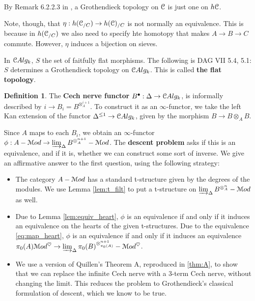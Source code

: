 \documentclass[10pt,a4paper,reqno,oneside]{book} %
\theoremstyle{plain}
\theoremstyle{definition}
\newtheorem{defin}[thm]{Definition}
\theoremstyle{remark}
\numberwithin{equation}{section}
\begin{document}
By Remark 6.2.2.3 in \cite{HTT}, a Grothendieck topology on $\mathcal C$ is just one on $h\mathcal C$.

Note, though, that $\eta : h(\mathcal C_{/C}) \to h(\mathcal C)_{/C}$ is not normally an equivalence. This is because in $h(\mathcal C_{/C})$
we also need to specify hte homotopy that makes $A \to B \to C$ commute. However, $\eta$ induces a bijection on sieves.

In $\mathcal C Alg_k$, $S$ the set of faitfully flat morphisms. The following is DAG VII 5.4, 5.1: $S$
determines a Grothendieck topology on $\mathcal C Alg_k$. This is called \textbf{the flat topology}.

\begin{defin}
The \textbf{Cech nerve functor} $B^{\bullet} : \Delta \to \mathcal C Alg_k$, is informally described by $i \to B_i = B^{\otimes_A^{i+1}}$.
To construct it as an $\infty$-functor, we take the left Kan extension of the functor $\Delta^{\leq 1} \to \mathcal C Alg_k$, given
by the morphism $B \to B \otimes_A B$. 
\end{defin}


Since $A$ maps to each $B_i$, we obtain an $\infty$-functor $\phi: A-\mathcal M od \to \varinjlim_{\Delta} B^{\otimes_A^{n+1}} - \mathcal M od$.
The \textbf{descent problem} asks if this is an equivalence, and if it is,
whether we can construct some sort of inverse. We give an affirmative answer to the first question, using the following
strategy:
\begin{itemize}
\item The category $A-\mathcal M od$ has a standard t-structure given by the degrees of the modules. We use Lemma \ref{lem:t_filt}
to put a t-structure on $\varinjlim_{\Delta} B^{\otimes_A^{n}} - \mathcal M od$ as well.
\item Due to Lemma \ref{lem:equiv_heart}, $\phi$ is an equivalence if and only if it induces an equivalence on the hearts
of the given t-structures. Due to the equivalence \ref{eq:map_heart}, $\phi$ is an equivalence if and only if it induces
an equivalence $\pi_0(A) \mathcal M od^{\heartsuit} \to \varinjlim_{\Delta} \pi_0(B)^{\otimes_{\pi_0(A)}^{n+1}} - \mathcal M od^{\heartsuit}$.
\item We use a version of Quillen's Theorem A, reproduced in \ref{thm:A}, to show that we can replace the infinite Cech nerve
with a 3-term Cech nerve, without changing the limit. This reduces the problem to Grothendieck's classical formulation of 
descent, which we know to be true.
\end{itemize}
\end{document}
